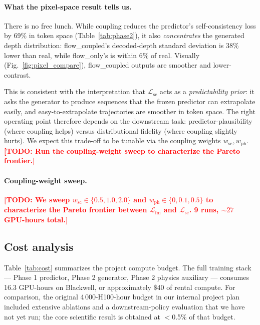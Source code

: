 \documentclass[10pt,letterpaper]{article}
\newcommand{\TODO}[1]{\textcolor{red}{\textbf{[TODO: #1]}}}
\newcommand{\fmloss}{\mathcal{L}_{\text{fm}}}
\newcommand{\scloss}{\mathcal{L}_{\text{sc}}}
\begin{document}
\paragraph{What the pixel-space result tells us.}
There is no free lunch. While coupling reduces the predictor's self-consistency loss by 69\% in token space (Table~\ref{tab:phase2}), it also \emph{concentrates} the generated depth distribution: flow\_coupled's decoded-depth standard deviation is 38\% lower than real, while flow\_only's is within 6\% of real. Visually (Fig.~\ref{fig:pixel_compare}), flow\_coupled outputs are smoother and lower-contrast.

This is consistent with the interpretation that $\scloss$ acts as a \emph{predictability prior}: it asks the generator to produce sequences that the frozen predictor can extrapolate easily, and easy-to-extrapolate trajectories are smoother in token space. The right operating point therefore depends on the downstream task: predictor-plausibility (where coupling helps) versus distributional fidelity (where coupling slightly hurts). We expect this trade-off to be tunable via the coupling weights $w_{\text{sc}}, w_{\text{ph}}$. \TODO{Run the coupling-weight sweep to characterize the Pareto frontier.}

\paragraph{Coupling-weight sweep.} \TODO{We sweep $w_{\text{sc}} \in \{0.5, 1.0, 2.0\}$ and $w_{\text{ph}} \in \{0, 0.1, 0.5\}$ to characterize the Pareto frontier between $\fmloss$ and $\scloss$. 9 runs, $\sim 27$ GPU-hours total.}

\subsection{Cost analysis}

Table~\ref{tab:cost} summarizes the project compute budget. The full training stack --- Phase 1 predictor, Phase 2 generator, Phase 2 physics auxiliary --- consumes 16.3 GPU-hours on Blackwell, or approximately \$40 of rental compute. For comparison, the original 4\,000-H100-hour budget in our internal project plan included extensive ablations and a downstream-policy evaluation that we have not yet run; the core scientific result is obtained at $<$0.5\% of that budget.
\end{document}
